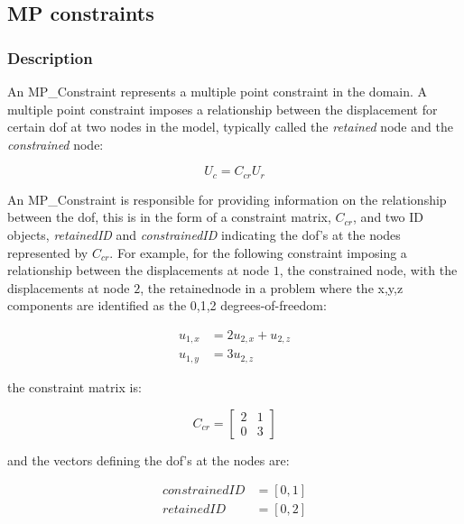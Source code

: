 \subsection{MP constraints}

\subsubsection{Description}
An MP\_Constraint represents a multiple point constraint in the domain. A multiple point constraint imposes a relationship between the displacement for certain dof at two nodes in the model, typically called the {\em retained} node and the {\em constrained} node:

\begin{equation}
U_c = C_{cr} U_r
\end{equation}


An MP\_Constraint is responsible for providing information on the relationship between the dof, this is in the form of a constraint matrix, $C_{cr}$, and two ID objects, {\em retainedID} and {\em constrainedID} indicating the dof's at the nodes represented by $C_{cr}$. For example, for the following constraint imposing a relationship between the displacements at node $1$, the constrained node, with the displacements at node $2$, the retainednode in a problem where the x,y,z components are identified as the 0,1,2 degrees-of-freedom:

\begin{align}
u_{1,x} &= 2 u_{2,x} + u_{2,z} \\
u_{1,y} &= 3 u_{2,z}
\end{align}

\noindent the constraint matrix is:

\begin{equation}
C_{cr} =
\left[
\begin{array}{cc}
2 & 1  \\
0 & 3
\end{array}
\right] 
\end{equation}

\noindent and the vectors defining the dof's at the nodes are:

\begin{align}
constrainedID &= [0, 1] \\
retainedID &= [0, 2]
\end{align}

